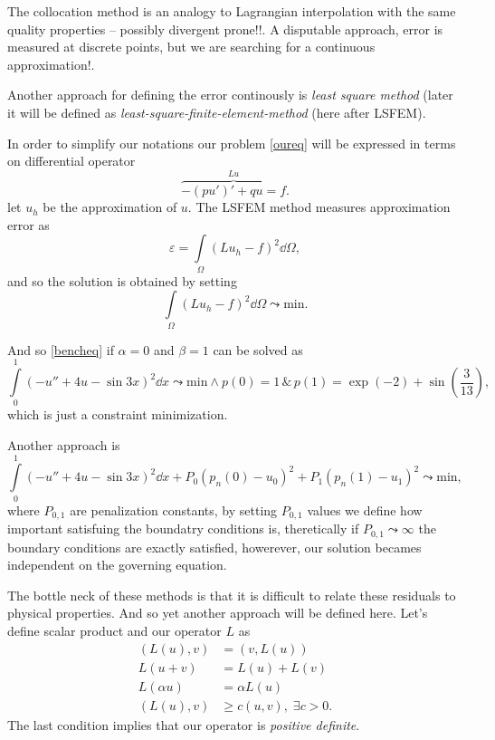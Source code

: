 The collocation method is an analogy to Lagrangian interpolation with the same quality properties  -- possibly divergent prone!!. A disputable approach, error is measured at discrete points, but we are searching for a continuous approximation!.


Another approach for defining the error continously is {\it least square method} (later it will be defined as {\it least-square-finite-element-method} (here after LSFEM).

In order to simplify our notations our problem \eqref{oureq} will be expressed in terms on differential operator
\begin{equation}
 \overbrace{- (p u')' + q u = f}^{Lu}.
\end{equation}
let $u_{h}$ be the approximation of $u$. The LSFEM method measures approximation error as
\begin{equation}
 \varepsilon = \int\limits_{\Omega} (L u_{h} - f )^{2} \dd \Omega,
\end{equation}
and so the solution is obtained by setting
\begin{equation}
  \int\limits_{\Omega} (L u_{h} - f )^{2} \dd \Omega \leadsto \mbox{min}.
\end{equation}

And so \eqref{bencheq} if $\alpha=0$ and $\beta=1$ can be solved as 
\begin{equation}
 \int\limits_{0}^{1} (  -u'' + 4u  - \sin 3x )^{2} \dd x \leadsto \mbox{min} \wedge p(0) = 1 \, \& \, p(1) = \exp(-2) + \sin\left(\frac{3}{13}\right),
\end{equation}
which is just a constraint minimization.

Another approach is 
\begin{equation}
 \int\limits_{0}^{1} (  -u'' + 4u  - \sin 3x )^{2} \dd x  + P_{0} (p_{n}(0)-u_{0})^{2} + P_{1} (p_{n}(1) - u_{1})^{2}\leadsto \mbox{min} ,
 \end{equation}
where $P_{0,1}$ are penalization constants, by setting $P_{0,1}$ values we define how important satisfuing the boundatry conditions is, theretically if $P_{0,1} \leadsto \infty$ the boundary conditions are exactly satisfied, howerever, our solution becames independent on the governing equation.

The bottle neck of these methods is that it is difficult to relate these residuals to physical properties. And so yet another approach will be defined here. Let's define scalar product and our operator $L$ as
\begin{equation}
\begin{split}
 (L(u),v) &= (v, L(u)) \\
  L(u + v) &= L(u) + L(v) \\
  L(\alpha u) &= \alpha L(u) \\
  (L(u),v) &\ge c(u,v), \; \exists c>0.
\end{split}
\end{equation}
The last condition implies that our operator is {\it positive definite}.

